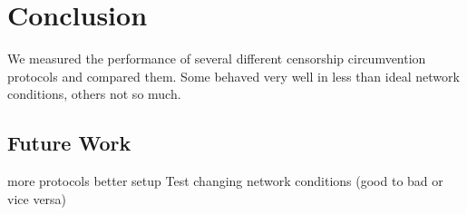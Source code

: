 
\chapter{Conclusion}
\label{chap:conclusion}

We measured the performance of several different censorship circumvention protocols and compared them. Some behaved very well in less than ideal network conditions, others not so much.

\section{Future Work}
more protocols
better setup
Test changing network conditions (good to bad or vice versa)
